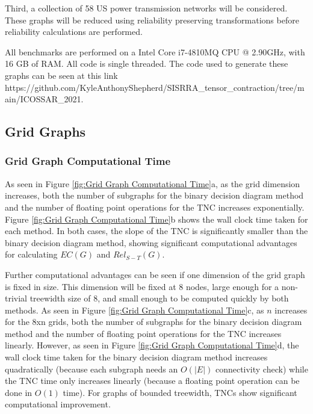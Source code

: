 \documentclass[12pt,twocolumn]{article}
\begin{document}
Third, a collection of 58 US power transmission networks \cite{li2016characterizing} will be considered. These graphs will be reduced using reliability preserving transformations before reliability calculations are performed.

All benchmarks are performed on a Intel Core i7-4810MQ CPU @ 2.90GHz, with 16 GB of RAM. All code is single threaded. The code used to generate these graphs can be seen at this link https://github.com/KyleAnthonyShepherd/SISRRA\_tensor\_contraction/tree/main/ICOSSAR\_2021.

\hypertarget{grid-graphs}{%
\subsection{Grid Graphs}\label{grid-graphs}}

\hypertarget{grid-graph-computational-time}{%
\subsubsection{Grid Graph Computational Time}\label{grid-graph-computational-time}}

As seen in Figure \ref{fig:Grid Graph Computational Time}a, as the grid dimension increases, both the number of subgraphs for the binary decision diagram method and the number of floating point operations for the TNC increases exponentially. Figure \ref{fig:Grid Graph Computational Time}b shows the wall clock time taken for each method. In both cases, the slope of the TNC is significantly smaller than the binary decision diagram method, showing significant computational advantages for calculating \(EC(G)\) and \(Rel_{S-T}(G)\).

Further computational advantages can be seen if one dimension of the grid graph is fixed in size. This dimension will be fixed at 8 nodes, large enough for a non-trivial treewidth size of 8, and small enough to be computed quickly by both methods. As seen in Figure \ref{fig:Grid Graph Computational Time}c, as \(n\) increases for the 8xn grids, both the number of subgraphs for the binary decision diagram method and the number of floating point operations for the TNC increases linearly. However, as seen in Figure \ref{fig:Grid Graph Computational Time}d, the wall clock time taken for the binary decision diagram method increases quadratically (because each subgraph needs an \(O(|E|)\) connectivity check) while the TNC time only increases linearly (because a floating point operation can be done in \(O(1)\) time). For graphs of bounded treewidth, TNCs show significant computational improvement.
\end{document}
